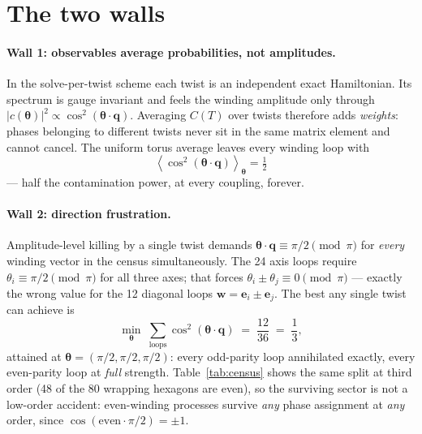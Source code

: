 \documentclass[11pt]{article}
\newcommand{\btheta}{\boldsymbol{\theta}}
\newcommand{\bq}{\mathbf{q}}
\newcommand{\bw}{\mathbf{w}}
\newcommand{\avg}[1]{\left\langle #1 \right\rangle}
\begin{document}
\section{The two walls}
\label{sec:walls}

\paragraph{Wall 1: observables average probabilities, not amplitudes.}
In the solve-per-twist scheme each twist is an independent exact Hamiltonian.
Its spectrum is gauge invariant and feels the winding amplitude only through
$|c(\btheta)|^2 \propto \cos^2(\btheta\cdot\bq)$.  Averaging $C(T)$ over
twists therefore adds \emph{weights}: phases belonging to different twists
never sit in the same matrix element and cannot cancel.  The uniform torus
average leaves every winding loop with
\begin{equation}
  \avg{\cos^2(\btheta\cdot\bq)}_{\btheta} = \tfrac12
\end{equation}
--- half the contamination power, at every coupling, forever.

\paragraph{Wall 2: direction frustration.}
Amplitude-level killing by a single twist demands
$\btheta\cdot\bq \equiv \pi/2 \pmod{\pi}$ for \emph{every} winding vector in
the census simultaneously.  The 24 axis loops require
$\theta_i \equiv \pi/2 \pmod{\pi}$ for all three axes; that forces
$\theta_i\pm\theta_j \equiv 0 \pmod{\pi}$ --- exactly the wrong value for the
12 diagonal loops $\bw=\mathbf{e}_i\pm\mathbf{e}_j$.  The best any single
twist can achieve is
\begin{equation}
  \min_{\btheta}\;\sum_{\text{loops}}\cos^2(\btheta\cdot\bq)
  \;=\; \frac{12}{36} \;=\; \frac13,
\end{equation}
attained at $\btheta=(\pi/2,\pi/2,\pi/2)$: every odd-parity loop annihilated
exactly, every even-parity loop at \emph{full} strength.  Table~\ref{tab:census}
shows the same split at third order (48 of the 80 wrapping hexagons are
even), so the surviving sector is not a low-order accident: even-winding
processes survive \emph{any} phase assignment at \emph{any} order, since
$\cos(\text{even}\cdot\pi/2)=\pm1$.
\end{document}
